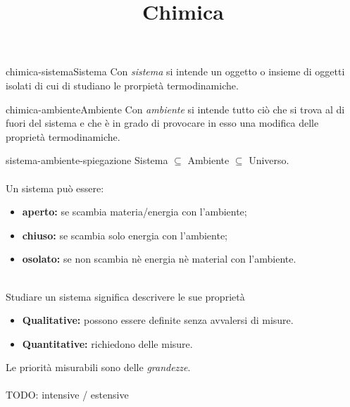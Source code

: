\documentclass[preview]{standalone}
\begin{document}
\title{Chimica}
\genpage

\begin{snippetdefinition}{chimica-sistema}{Sistema}
    Con \textit{sistema}
    si intende un oggetto o insieme di oggetti isolati
    di cui di studiano le prorpietà termodinamiche.
\end{snippetdefinition}

\begin{snippetdefinition}{chimica-ambiente}{Ambiente}
    Con \textit{ambiente} si intende tutto ciò che si
    trova al di fuori del sistema e che è in grado
    di provocare in esso una modifica delle proprietà
    termodinamiche.
\end{snippetdefinition}

\begin{snippet}{sistema-ambiente-spiegazione}
Sistema \(\subseteq\) Ambiente \(\subseteq\) Universo.
\\\\
Un sistema può essere:
\begin{itemize}
    \item \textbf{aperto:} se scambia materia/energia con l'ambiente;
    \item \textbf{chiuso:} se scambia solo energia con l'ambiente;
    \item \textbf{osolato:} se non scambia nè energia nè material con l'ambiente.
\end{itemize}
\phantom{}\\
Studiare un sistema significa descrivere le sue proprietà
\begin{itemize}
    \item \textbf{Qualitative:} possono essere definite senza avvalersi
    di misure.
    \item \textbf{Quantitative:} richiedono delle misure.
\end{itemize}
Le priorità misurabili sono delle \textit{grandezze}.
\\\\
TODO: intensive / estensive
\end{snippet}
\end{document}
